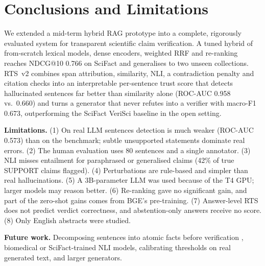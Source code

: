 \documentclass[conference]{IEEEtran}
\begin{document}
\section{Conclusions and Limitations}
We extended a mid-term hybrid RAG prototype into a complete, rigorously evaluated system for transparent scientific claim
verification. A tuned hybrid of from-scratch lexical models, dense encoders, weighted RRF and re-ranking reaches NDCG@10
0.766 on SciFact and generalises to two unseen collections. RTS~v2 combines span attribution, similarity, NLI, a
contradiction penalty and citation checks into an interpretable per-sentence trust score that detects hallucinated
sentences far better than similarity alone (ROC-AUC 0.958 vs.\ 0.660) and turns a generator that never refutes into a
verifier with macro-F1 0.673, outperforming the SciFact VeriSci baseline in the open setting.

\textbf{Limitations.} (1) On real LLM sentences detection is much weaker (ROC-AUC 0.573) than on the benchmark; subtle
unsupported statements dominate real errors. (2) The human evaluation uses 80 sentences and a single annotator. (3) NLI
misses entailment for paraphrased or generalised claims (42\% of true SUPPORT claims flagged). (4) Perturbations are
rule-based and simpler than real hallucinations. (5) A 3B-parameter LLM was used because of the T4 GPU; larger models may
reason better. (6) Re-ranking gave no significant gain, and part of the zero-shot gains comes from BGE's pre-training.
(7) Answer-level RTS does not predict verdict correctness, and abstention-only answers receive no score. (8) Only English
abstracts were studied.

\textbf{Future work.} Decomposing sentences into atomic facts before verification \cite{min2023factscore}, biomedical or
SciFact-trained NLI models, calibrating thresholds on real generated text, and larger generators.
\end{document}
